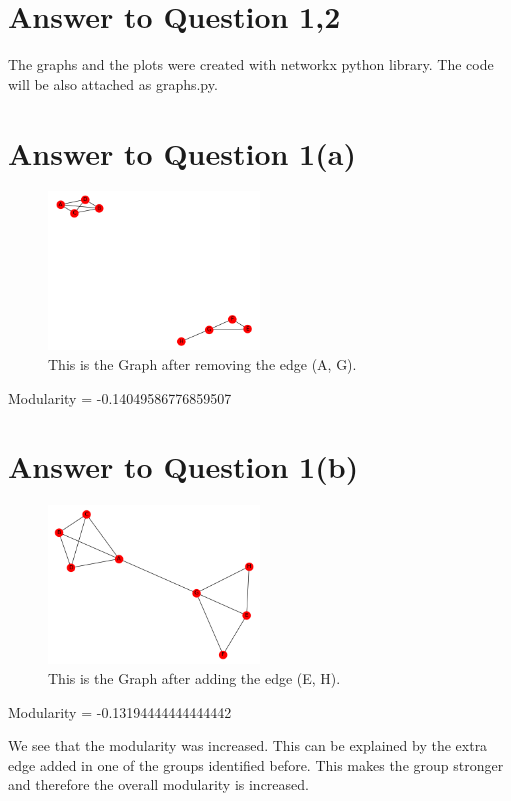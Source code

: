 \documentclass[11pt]{article}
\begin{document}
\pagebreak[4]
\section*{Answer to Question 1,2}
The graphs and the plots were created with networkx python library. The code will be also attached as graphs.py.
\section*{Answer to Question 1(a)}
\begin{figure}[h]
\caption{This is the Graph after removing the edge (A, G).}
\centering
\includegraphics[width=0.5\textwidth]{./figures/G_a}
\end{figure}
Modularity =  -0.14049586776859507

\section*{Answer to Question 1(b)}
\begin{figure}[h]
\caption{This is the Graph after adding the edge (E, H).}
\centering
\includegraphics[width=0.5\textwidth]{./figures/G_b}
\end{figure}
Modularity =  -0.13194444444444442

We see that the modularity was increased. This can be explained by the extra edge added in one of the groups identified before. This makes the group stronger and therefore the overall modularity is increased.
\end{document}
